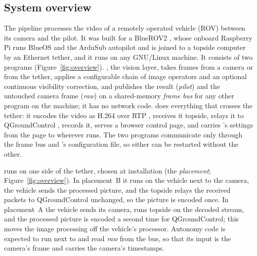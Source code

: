 \subsection{System overview}\label{sec:overview}

The pipeline processes the video of a remotely operated vehicle (ROV)
between its
camera and the pilot. It was built for a BlueROV2 \cite{bluerov2}, whose onboard
Raspberry Pi runs BlueOS and the ArduSub autopilot \cite{ardusub} and
is joined to a
topside computer by an Ethernet tether, and it runs on any GNU/Linux machine. It
consists of two programs (Figure~\ref{fig:overview}). \eeye{}, the
vision layer, takes
frames from a camera or from the tether, applies a configurable chain of image
operators and an optional continuous visibility correction, and
publishes the result
(\emph{pilot}) and the untouched camera frame (\emph{raw}) on a shared-memory
\emph{frame bus} for any other program on the machine; it has no network code.
\hellion{} does everything that crosses the tether: it encodes the
video as H.264
\cite{itu_h264} over RTP \cite{rfc3550,rfc6184}, receives it topside,
relays it to
QGroundControl \cite{qgroundcontrol}, records it, serves a browser
control page, and
carries \eeye{}'s settings from the page to wherever \eeye{} runs.
The two programs
communicate only through the frame bus and \eeye{}'s configuration
file, so either can
be restarted without the other.

\eeye{} runs on one side of the tether, chosen at installation (the
  \emph{placement};
Figure~\ref{fig:overview}). In placement~B it runs on the vehicle
next to the camera,
the vehicle sends the processed picture, and the topside relays the
received packets to
QGroundControl unchanged, so the picture is encoded once. In
placement~A the vehicle
sends its camera, \eeye{} runs topside on the decoded stream, and the
processed picture
is encoded a second time for QGroundControl; this moves the image
processing off the
vehicle's processor. Autonomy code is expected to run next to \eeye{} and read
\emph{raw} from the bus, so that its input is the camera's frame and carries the
camera's timestamps.

